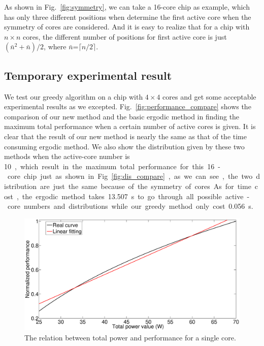 As shown in Fig.~\ref{fig:symmetry}, we can take a 16-core chip as example, which has only three different positions when determine
the first active core when the symmetry of cores are considered. And it is easy to realize that for a chip with $n
\times n$ cores, the different number of positions for first active core is just $(\bar{n}^2+\bar{n})/2$, where
$\bar{n}$=$\lceil n/2 \rceil$.
\subsection{Temporary experimental result}
We test our greedy algorithm on a chip with $4 \times 4$ cores and get some acceptable experimental results as we
excepted. Fig.~\ref{fig:performance_compare} shows the comparison of our new method and the basic ergodic method in finding the maximum total
performance when a certain number of active cores is given. It is clear that the result of our new method is nearly the
same as that of the time consuming ergodic method. We also show the distribution given by these two methods when the
active-core number is \SI{10}, which result in the maximum total performance for this 16-core chip just as shown in
Fig.~\ref{fig:dis_compare}, as we can see, the two distribution are just the same because of the symmetry of cores.
As for time cost, the ergodic method takes \SI{13.507}s to go through all possible active-core numbers and distributions
while our greedy method only cost \SI{0.056}s.


\begin{figure}
\centering
\includegraphics[width=0.7\columnwidth]{fig/p_tot_f.eps}
\caption{The relation between total power and performance for a single core.
}
\label{fig:p_tot_f}
\end{figure}



